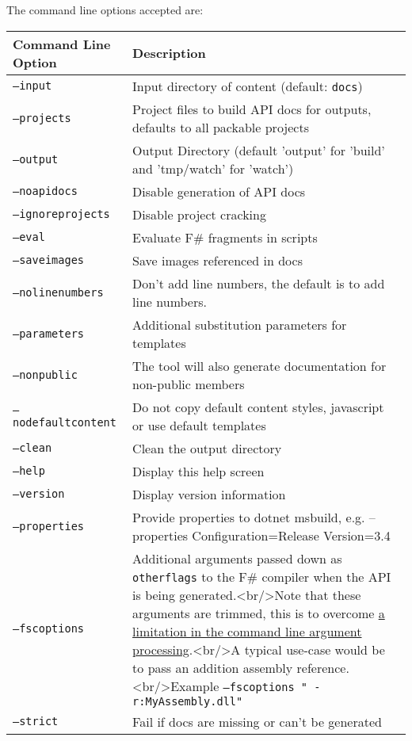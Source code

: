 \documentclass{article}
\begin{document}
The command line options accepted are:
\begin{tabular}{|l|l|}\hline
\textbf{Command Line Option} & \textbf{Description}\\ \hline\hline
\texttt{--input} & Input directory of content (default: \texttt{docs})\\ \hline
\texttt{--projects} & Project files to build API docs for outputs, defaults to all packable projects\\ \hline
\texttt{--output} & Output Directory (default 'output' for 'build' and 'tmp/watch' for 'watch')\\ \hline
\texttt{--noapidocs} & Disable generation of API docs\\ \hline
\texttt{--ignoreprojects} & Disable project cracking\\ \hline
\texttt{--eval} & Evaluate F\# fragments in scripts\\ \hline
\texttt{--saveimages} & Save images referenced in docs\\ \hline
\texttt{--nolinenumbers} & Don't add line numbers, the default is to add line numbers.\\ \hline
\texttt{--parameters} & Additional substitution parameters for templates\\ \hline
\texttt{--nonpublic} & The tool will also generate documentation for non-public members\\ \hline
\texttt{--nodefaultcontent} & Do not copy default content styles, javascript or use default templates\\ \hline
\texttt{--clean} & Clean the output directory\\ \hline
\texttt{--help} & Display this help screen\\ \hline
\texttt{--version} & Display version information\\ \hline
\texttt{--properties} & Provide properties to dotnet msbuild, e.g. --properties Configuration=Release Version=3.4\\ \hline
\texttt{--fscoptions} & Additional arguments passed down as \texttt{otherflags} to the F\# compiler when the API is being generated.<br/>Note that these arguments are trimmed, this is to overcome \href{https://github.com/commandlineparser/commandline/issues/58}{a limitation in the command line argument processing}.<br/>A typical use-case would be to pass an addition assembly reference.<br/>Example \texttt{--fscoptions " -r:MyAssembly.dll"}\\ \hline
\texttt{--strict} & Fail if docs are missing or can't be generated\\ \hline
\end{tabular}
\end{document}
